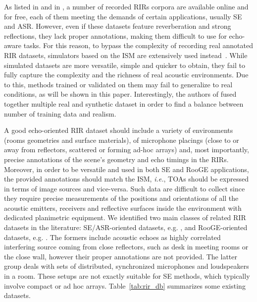 As listed in \cite{Szoke2018building} and in \cite{Genovese2019blind}, a number of recorded RIRs corpora are available online and for free, each of them meeting the demands of certain applications, usually SE and ASR. However, even if these datasets feature reverberation and strong reflections, they lack proper annotations, making them difficult to use for echo-aware tasks. For this reason, to bypass the complexity of recording real annotated RIR datasets, simulators based on the ISM are extensively used instead~\cite{Gaultier2017vast, Kim2017generation, Perotin2018crnn}. While simulated datasets are more versatile, simple and quicker to obtain, they fail to fully capture the complexity and the richness of real acoustic environments. Due to this, methods trained or validated on them may fail to generalize to real conditions, as will be shown in this paper. Interestingly, the authors of \cite{Genovese2019blind} fused together multiple real and synthetic dataset in order to find a balance between number of training data and realism.

A good echo-oriented RIR dataset should include a variety of environments (rooms geometries and surface materials), of microphone placings (close to or away from reflectors, scattered or forming ad-hoc arrays) and, most importantly, precise annotations of the scene's geometry and echo timings in the RIRs. Moreover, in order to be versatile and used in both SE and RooGE applications, the provided annotations should match the ISM, \textit{i.e.}, TOAs should be expressed in terms of image sources and vice-versa. Such data are difficult to collect since they require precise measurements of the positions and orientations of all the acoustic emitters, receivers and reflective surfaces inside the environment with dedicated planimetric equipment. We identified two main classes of related RIR datasets in the literature: SE/ASR-oriented datasets, e.g. \cite{Szoke2018building, Bertin2019voice, Cmejla2019mirage}, and RooGE-oriented datasets, e.g. \cite{Dokmanic2013acoustic, Crocco2017uncalibrated, remaggi2017acoustic}. The formers include acoustic echoes as highly correlated interfering source coming from close reflectors, such as desk in meeting rooms or the close wall, however their proper annotations are not provided. The latter group deals with sets of distributed, synchronized microphones and loudspeakers in a room. These setups are not exactly suitable for SE methods, which typically involve compact or ad hoc arrays. Table~\ref{tab:rir_db} summarizes some existing datasets.

